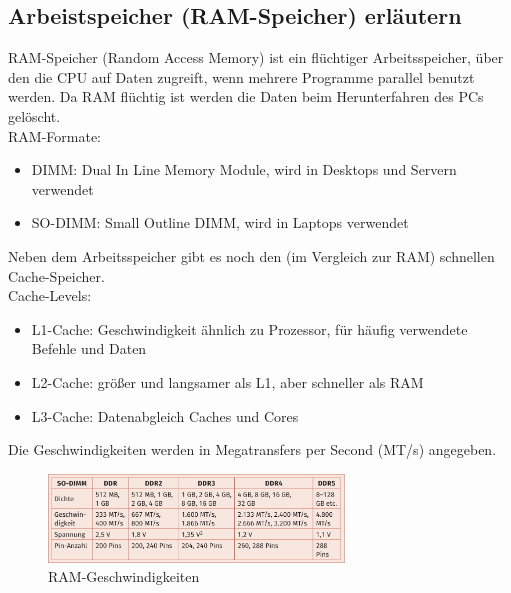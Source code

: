 \subsection{Arbeistspeicher (RAM-Speicher) erläutern}
    \begin{subindent}
        RAM-Speicher (Random Access Memory) ist ein flüchtiger Arbeitsspeicher, über den die CPU auf Daten zugreift, wenn mehrere Programme parallel benutzt werden. Da RAM flüchtig ist werden die Daten beim Herunterfahren des PCs gelöscht. \\
        RAM-Formate:
        \begin{itemize}[leftmargin=2.5cm,, itemsep=0.1em, parsep=0.3em]
            \item DIMM\@: Dual In Line Memory Module, wird in Desktops und Servern verwendet
            \item SO-DIMM\@: Small Outline DIMM, wird in Laptops verwendet
        \end{itemize}
        Neben dem Arbeitsspeicher gibt es noch den (im Vergleich zur RAM) schnellen Cache-Speicher. \\
        Cache-Levels:
        \begin{itemize}[leftmargin=2.5cm, itemsep=0.1em, parsep=0.3em]
            \item L1-Cache: Geschwindigkeit ähnlich zu Prozessor, für häufig verwendete Befehle und Daten
            \item L2-Cache: größer und langsamer als L1, aber schneller als RAM
            \item L3-Cache: Datenabgleich Caches und Cores
        \end{itemize}
        Die Geschwindigkeiten werden in Megatransfers per Second (MT/s) angegeben.
    \end{subindent}

    \begin{figure}[ht]
        \centering
        \includegraphics[width=0.7\textwidth]{./images/2.4.4_ramspeeds.png}
        \caption{RAM-Geschwindigkeiten}\label{fig:RAM-Geschwindigkeiten}
    \end{figure}

